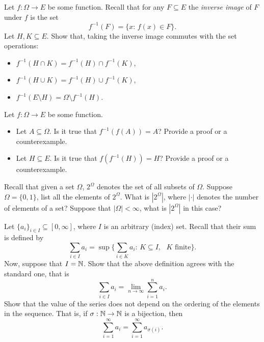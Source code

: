 \begin{problem}Let $f:\Omega \to E$ be some function. Recall that for any $F\subseteq E$ the \emph{inverse image} of $F$ under $f$ is the set 
    \begin{equation*}
        f^{-1}(F) = \{x:\,f(x)\in F\}.
    \end{equation*}
    Let $H,K\subseteq E$. Show that, taking the inverse image commutes with the set operations:
\begin{itemize}
        \item $f^{-1}(H\cap K) = f^{-1}(H)\cap f^{-1}(K)$,
        \item $f^{-1}(H\cup K) = f^{-1}(H)\cup f^{-1}(K)$,
        \item $f^{-1}(E\setminus H) = \Omega \setminus f^{-1}(H)$.
\end{itemize}
\end{problem}

\begin{problem} Let $f:\Omega \to E$ be some function.
    \begin{itemize}
        \item Let $A\subseteq \Omega$. Is it true that $f^{-1}(f(A)) = A$? Provide a proof or a counterexample.
        \item Let $H\subseteq E$.  Is it true that $f(f^{-1}(H)) = H$? Provide a proof or a counterexample.
    \end{itemize}
\end{problem}

\begin{problem} Recall that given a set $\Omega$, $2^{\Omega}$ denotes the set of all subsets of $\Omega$. Suppose $\Omega = \{0,1\}$, list all the elements of $2^{\Omega}$. What is $|2^{\Omega}|$, where $|\cdot|$ denotes the number of elements of a set? Suppose that $|\Omega|<\infty$, what is $|2^{\Omega}|$ in this case? 
\end{problem}

\begin{problem} Let $\{a_i\}_{i\in I} \subseteq [0,\infty]$, where $I$ is an arbitrary (index) set. Recall that their sum is defined by
    \begin{equation*}
        \sum_{i\in I} a_i = \sup\Big\{\sum_{i\in K} a_i:\, K\subseteq I,\text{ $K$ finite}\Big\}.
    \end{equation*}
Now, suppose that $I = \mathbb N$. Show that the above definition agrees with the standard one, that is
\begin{equation*}
    \sum_{i\in I} a_i = \lim_{n\to\infty} \sum_{i=1}^n a_i.
\end{equation*}
Show that the value of the series does not depend on the ordering of the elements in the sequence. That is, if $\sigma:\mathbb N\to \mathbb N$ is a bijection, then 
\begin{equation*}
    \sum_{i=1}^\infty a_i = \sum_{i=1}^\infty a_{\sigma(i)}.
\end{equation*}
\end{problem}

